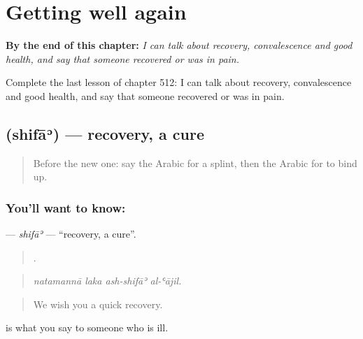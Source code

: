 
\chapter{Getting well again}
\label{ch:ar-getting-well-again}

\begin{chapteropening}
\textbf{By the end of this chapter:} \emph{I can talk about recovery, convalescence and good health, and say that someone recovered or was in pain.}

Complete the last lesson of chapter 512: I can talk about recovery, convalescence and good health, and say that someone recovered or was in pain.
\end{chapteropening}

\section[\texorpdfstring{\ar{شفاء} (shifāʾ)}{شفاء (shifāʾ)}]{ (shifāʾ) — recovery, a cure}

\label{lesson:AR-C512-shifa}



\begin{quote}
Before the new one: say the Arabic for a splint, then the Arabic for to bind up.
\end{quote}

\subsection*{You'll want to know: }
\textbf{} — \emph{shifāʾ} — \textquotedblleft{}recovery, a cure\textquotedblright{}.

\begin{quote}
   .
\end{quote}

\begin{quote}
\emph{natamannā laka ash-shifāʾ al-ʿājil.}
\end{quote}

\begin{quote}
We wish you a quick recovery.
\end{quote}

   is what you say to someone who is ill.

